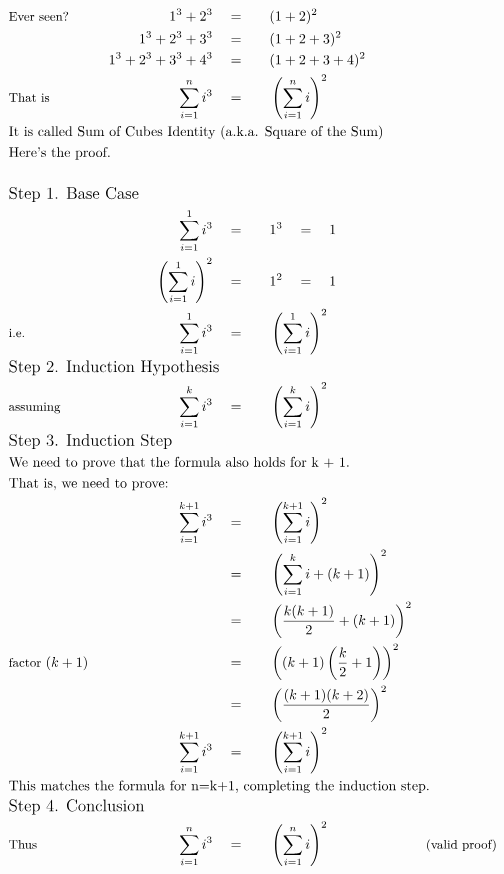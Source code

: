 \begin{alignat*}{5}
&\small\text{Ever seen?}\qquad&1^3+2^3\quad&=\quad&&(1+2)^2\\
&\,&1^3+2^3+3^3\quad&=\quad&&(1+2+3)^2\\
&\,&1^3+2^3+3^3+4^3\quad&=\quad&&(1+2+3+4)^2\\
&\small\text{That is}&\sum_{i=1}^{n}i^3\quad&=&&\left(\sum_{i=1}^{n}i\right)^2\\
&\rlap{\text{It is called Sum of Cubes Identity (a.k.a. Square of the Sum)}}\\
&\rlap{\text{Here's the proof.}}\\ \\
&\rlap{\large\text{Step 1. Base Case}}\\
&\,&\sum_{i=1}^{1}i^3\quad&=&&1^3\quad=\quad1\\
&\,&\left(\sum_{i=1}^{1}i\right)^2\quad&=&&1^2\quad=\quad1\\
&\small\text{i.e.}&\sum_{i=1}^{1}i^3\quad&=&&\left(\sum_{i=1}^{1}i\right)^2\\
&\rlap{\large\text{Step 2. Induction Hypothesis}}\\
&\small\text{assuming}&\sum_{i=1}^{k}i^3\quad&=&&\left(\sum_{i=1}^{k}i\right)^2\\
&\rlap{\large\text{Step 3. Induction Step}}\\
&\rlap{\text{We need to prove that the formula also holds for k + 1.}}\\
&\rlap{\text{That is, we need to prove:}}\\
&\,&\sum_{i=1}^{k+1}i^3\quad&=&&\left(\sum_{i=1}^{k+1}i\right)^2\\
&\,&\,&=&&\left(\sum_{i=1}^{k}i+(k+1)\right)^2\\
&\,&\,&=&&\left(\frac{k(k+1)}{2}+(k+1)\right)^2\\
&\small\text{factor }(k+1)&\,&=&&\left((k+1)\left(\frac{k}{2}+1\right)\right)^2\\
&\,&\,&=&&\left(\frac{(k+1)(k+2)}{2}\right)^2\\
&\,&\sum_{i=1}^{k+1}i^3\quad&=&&\left(\sum_{i=1}^{k+1}i\right)^2\\
&\rlap{\text{This matches the formula for }n=k+1\text{, completing the induction step.}}\\
&\rlap{\large\text{Step 4. Conclusion}}\\
&\small\text{Thus}&\sum_{i=1}^{n}i^3\quad&=&&\left(\sum_{i=1}^{n}i\right)^2\qquad&&\small\text{(valid proof)}\\
\end{alignat*}
